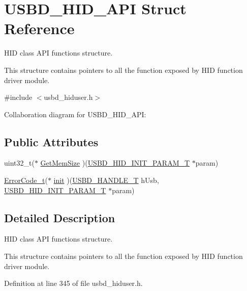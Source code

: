 \hypertarget{structUSBD__HID__API}{}\section{U\+S\+B\+D\+\_\+\+H\+I\+D\+\_\+\+A\+PI Struct Reference}
\label{structUSBD__HID__API}


H\+ID class A\+PI functions structure.

This structure contains pointers to all the function exposed by H\+ID function driver module.  




{\ttfamily \#include $<$usbd\+\_\+hiduser.\+h$>$}



Collaboration diagram for U\+S\+B\+D\+\_\+\+H\+I\+D\+\_\+\+A\+PI\+:
\subsection*{Public Attributes}
\begin{DoxyCompactItemize}
\item 
uint32\+\_\+t($\ast$ \hyperlink{structUSBD__HID__API_a020839a4e29677899bb7a0a2c11b1252}{Get\+Mem\+Size} )(\hyperlink{group__USBD__HID_ga192251fa5ec461eaa9a77b76dbe7c3fa}{U\+S\+B\+D\+\_\+\+H\+I\+D\+\_\+\+I\+N\+I\+T\+\_\+\+P\+A\+R\+A\+M\+\_\+T} $\ast$param)
\item 
\hyperlink{error_8h_a905255056c349318139d94aa4523d516}{Error\+Code\+\_\+t}($\ast$ \hyperlink{structUSBD__HID__API_a7b98c434713f1deb07abafcb52fae76d}{init} )(\hyperlink{group__USBD__Core_gafdbb2204d929cb9d75736bd2b42342ac}{U\+S\+B\+D\+\_\+\+H\+A\+N\+D\+L\+E\+\_\+T} h\+Usb, \hyperlink{group__USBD__HID_ga192251fa5ec461eaa9a77b76dbe7c3fa}{U\+S\+B\+D\+\_\+\+H\+I\+D\+\_\+\+I\+N\+I\+T\+\_\+\+P\+A\+R\+A\+M\+\_\+T} $\ast$param)
\end{DoxyCompactItemize}


\subsection{Detailed Description}
H\+ID class A\+PI functions structure.

This structure contains pointers to all the function exposed by H\+ID function driver module. 



Definition at line 345 of file usbd\+\_\+hiduser.\+h.



